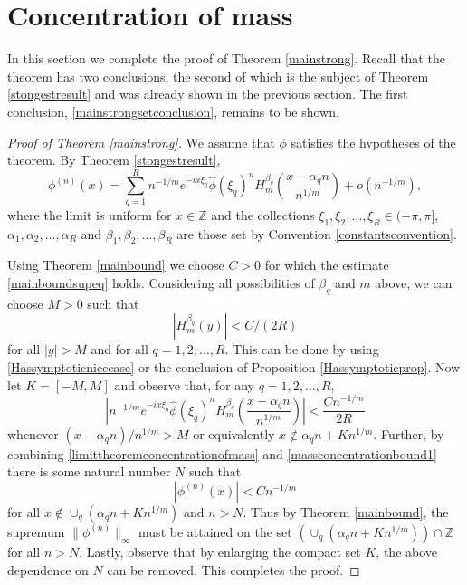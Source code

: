 \documentclass{article}
\theoremstyle{theorem}
\theoremstyle{remark}
\begin{document}
\section{Concentration of mass}\label{masssec}

\noindent In this section we complete the proof of Theorem \ref{mainstrong}. Recall that the theorem has two conclusions, the second of which is the subject of Theorem \ref{stongestresult} and was already shown in the previous section. The first conclusion, \eqref{mainstrongsetconclusion}, remains to be shown.

\begin{proof}[Proof of Theorem \ref{mainstrong}]
We assume that $\phi$ satisfies the hypotheses of the theorem. By Theorem \ref{stongestresult},
\begin{equation}\label{limittheoremconcentrationofmass}
\phi^{(n)}(x)=\sum_{q=1}^{R}n^{-1/m}e^{-ix\xi_q}\hat{\phi}(\xi_q)^n H_m^{\beta_q}\left(\frac{x-\alpha_qn}{n^{1/m}}\right)+o(n^{-1/m}),
\end{equation}
where the limit is uniform for $x\in \mathbb{Z}$ and the collections $\xi_1,\xi_2,\dots,\xi_R\in(-\pi,\pi]$, $\alpha_1,\alpha_2,\dots,\alpha_R$ and $\beta_1,\beta_2,\dots,\beta_R$ are those set by Convention \ref{constantsconvention}.

Using Theorem \ref{mainbound} we choose $C>0$ for which the estimate \eqref{mainboundsupeq} holds. Considering all possibilities of $\beta_q$ and $m$ above, we can choose $M>0$ such that
\begin{equation*}
|H_m^{\beta_q}(y)|< C/(2R)
\end{equation*}
for all $|y|> M$ and for all $q=1,2,\dots, R$. This can be done by using \eqref{Hassymptoticnicecase} or the conclusion of Proposition \ref{Hassymptoticprop}. Now let $K=[-M,M]$ and observe that, for any $q=1,2,\dots,R$, 
\begin{equation}\label{massconcentrationbound1}
 \left|n^{-1/m}e^{-ix\xi_q}\hat{\phi}(\xi_q)^n H_m^{\beta_q}\left(\frac{x-\alpha_qn}{n^{1/m}}\right)\right|<\frac{Cn^{-1/m}}{2R}
\end{equation}
whenever $(x-\alpha_q n)/n^{1/m}>M$ or equivalently $x\notin \alpha_q n+ Kn^{1/m}$.  Further, by combining \eqref{limittheoremconcentrationofmass} and \eqref{massconcentrationbound1} there is some natural number $N$ such that
\begin{equation*}
|\phi^{(n)}(x)|< C  n^{-1/m}
\end{equation*}
for all $x\notin \cup_q(\alpha_q n+ Kn^{1/m})$ and $n>N$. Thus by Theorem \ref{mainbound}, the supremum $\|\phi^{(n)}\|_{\infty}$ must be attained on the set $(\cup_q(\alpha_q n+ Kn^{1/m}))\cap\mathbb{Z}$ for all $n>N$. Lastly, observe that by enlarging the compact set $K$, the above dependence on $N$ can be removed. This completes the proof.

\end{proof}
\end{document}
